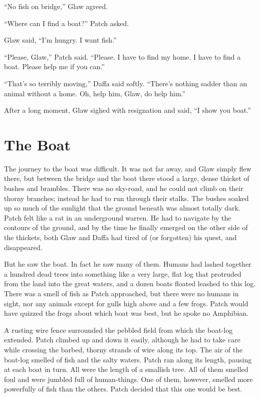 \documentclass[12pt]{memoir}
\begin{document}
“No fish on bridge,” Glaw agreed.

“Where can I find a boat?” Patch asked.

Glaw said, “I’m hungry. I want fish.”

“Please, Glaw,” Patch said. “Please. I have to find my home. I have to
find a boat. Please help me if you can.”

“That’s so terribly moving,” Daffa said softly. “There’s nothing
sadder than an animal without a home. Oh, help him, Glaw, do help
him.”

After a long moment, Glaw sighed with resignation and said, “I show
you boat.”


\section{The Boat}

The journey to the boat was difficult. It was not far away, and Glaw
simply flew there, but between the bridge and the boat there stood a
large, dense thicket of bushes and brambles. There was no sky-road,
and he could not climb on their thorny branches; instead he had to run
through their stalks. The bushes soaked up so much of the sunlight
that the ground beneath was almost totally dark. Patch felt like a rat
in an underground warren. He had to navigate by the contours of the
ground, and by the time he finally emerged on the other side of the
thickets, both Glaw and Daffa had tired of (or forgotten) his quest,
and disappeared.

But he saw the boat. In fact he saw many of them. Humans had lashed
together a hundred dead trees into something like a very large, flat
log that protruded from the land into the great waters, and a dozen
boats floated leashed to this log. There was a smell of fish as Patch
approached, but there were no humans in sight, nor any animals except
for gulls high above and a few frogs. Patch would have quizzed the
frogs about which boat was best, but he spoke no Amphibian.

A rusting wire fence surrounded the pebbled field from which the
boat-log extended. Patch climbed up and down it easily, although he
had to take care while crossing the barbed, thorny strands of wire
along its top. The air of the boat-log smelled of fish and the salty
waters. Patch ran along its length, pausing at each boat in turn. All
were the length of a smallish tree. All of them smelled foul and were
jumbled full of human-things. One of them, however, smelled more
powerfully of fish than the others. Patch decided that this one would
be best.
\end{document}
